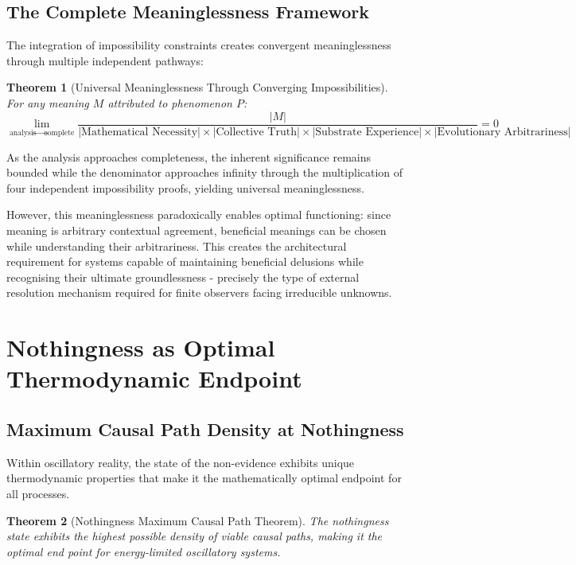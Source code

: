 \documentclass[12pt,a4paper]{article}
\newtheorem{theorem}{Theorem}
\begin{document}
\subsection{The Complete Meaninglessness Framework}

The integration of impossibility constraints creates convergent meaninglessness through multiple independent pathways:

\begin{theorem}[Universal Meaninglessness Through Converging Impossibilities]
For any meaning $M$ attributed to phenomenon $P$:
$$\lim_{\text{analysis} \to \text{complete}} \frac{|M|}{|\text{Mathematical Necessity}| \times |\text{Collective Truth}| \times |\text{Substrate Experience}| \times |\text{Evolutionary Arbitrariness}|} = 0$$
\end{theorem}

As the analysis approaches completeness, the inherent significance remains bounded while the denominator approaches infinity through the multiplication of four independent impossibility proofs, yielding universal meaninglessness.

However, this meaninglessness paradoxically enables optimal functioning: since meaning is arbitrary contextual agreement, beneficial meanings can be chosen while understanding their arbitrariness. This creates the architectural requirement for systems capable of maintaining beneficial delusions while recognising their ultimate groundlessness - precisely the type of external resolution mechanism required for finite observers facing irreducible unknowns.

\section{Nothingness as Optimal Thermodynamic Endpoint}

\subsection{Maximum Causal Path Density at Nothingness}

Within oscillatory reality, the state of the non-evidence exhibits unique thermodynamic properties that make it the mathematically optimal endpoint for all processes.

\begin{theorem}[Nothingness Maximum Causal Path Theorem]
The nothingness state exhibits the highest possible density of viable causal paths, making it the optimal end point for energy-limited oscillatory systems.
\end{theorem}
\end{document}
